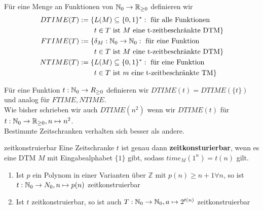 \begin{defn}{}
    Für eine Menge an Funktionen von $\mathbb{N}_0 \to \mathbb{R}_{\geq 0}$ definieren wir
    \begin{align*}
        DTIME(T) := \{ & L(M) \subseteq \{0, 1\}^* : \text{ für alle Funktionen } \\ &  t \in T \text{ ist } M \text{ eine t-zeitbeschränkte DTM}\}\\
        FTIME(T) := \{ & \delta_M : \mathbb{N}_0 \to \mathbb{N}_0 :  \text{ für eine Funktion } \\ &  t \in T \text{ ist } M \text{ eine t-zeitbeschränkte DTM}\}\\
        NTIME(T) := \{ & L(M) \subseteq \{0, 1\}^* : \text{ für eine Funktion } \\ &  t \in T \text{ ist } m \text{ eine t-zeitbeschränkte TM}\}
    \end{align*}
    
    Für eine Funktion $t : \mathbb{N}_0 \to R_{\geq 0}$ definieren wir $DTIME(t) = DTIME(\{t\})$ und analog für $FTIME, NTIME$.\\
    Wie bisher schrieben wir auch $DTIME(n^2)$ wenn wir $DTIME(t)$ für $t : \mathbb{N}_0 \to \mathbb{R}_{\geq 0}, n \mapsto n^2$.\\
    Bestimmte Zeitschranken verhalten sich besser als andere.
\end{defn}

\begin{defn}{zeitkonstruierbar}
    Eine Zeitschranke $t$ ist genau dann \textbf{zeitkonsturierbar}, wenn es eine DTM $M$ mit Eingabealphabet $\{1\}$ gibt, sodass $time_M(1^n) = t(n)$ gilt.
\end{defn}

\begin{bem}
    \begin{enumerate}
        \item Ist $p$ ein Polynom in einer Varianten über $\mathbb{Z}$ mit $p(n) \geq n+1 \forall n$, so ist $t : \mathbb{N}_0 \to N_0, n \mapsto p(n)$ zeitkonstruierbar
        \item Ist $t$ zeitkonstruierbar, so ist auch $T : \mathbb{N}_0 \to \mathbb{N}_0, a \mapsto 2^{t(n)}$ zeitkonstruierbar
    \end{enumerate}
\end{bem}

